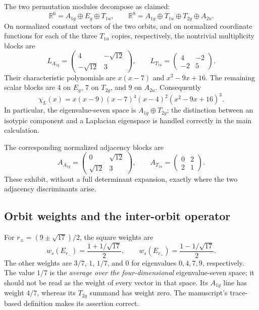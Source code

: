 \documentclass[11pt,a4paper]{article}
\newcommand{\R}{\mathbb R}
\begin{document}
The two permutation modules decompose as claimed:
\[
\R^6=A_{1g}\oplus E_g\oplus T_{1u},\qquad
\R^8=A_{1g}\oplus T_{1u}\oplus T_{2g}\oplus A_{2u}.
\]
On normalized constant vectors of the two orbits, and on normalized coordinate functions for each of the three $T_{1u}$ copies, respectively, the nontrivial multiplicity blocks are
\begin{equation}
L_{A_{1g}}=\begin{pmatrix}4&-\sqrt{12}\\-\sqrt{12}&3\end{pmatrix},
\qquad
L_{T_{1u}}=\begin{pmatrix}4&-2\\-2&5\end{pmatrix}.
\end{equation}
Their characteristic polynomials are $x(x-7)$ and $x^2-9x+16$. The remaining scalar blocks are $4$ on $E_g$, $7$ on $T_{2g}$, and $9$ on $A_{2u}$. Consequently
\[
\chi_L(x)=x(x-9)(x-7)^4(x-4)^2(x^2-9x+16)^3.
\]
In particular, the eigenvalue-seven space is $A_{1g}\oplus T_{2g}$; the distinction between an isotypic component and a Laplacian eigenspace is handled correctly in the main calculation.

The corresponding normalized adjacency blocks are
\[
A_{A_{1g}}=\begin{pmatrix}0&\sqrt{12}\\\sqrt{12}&3\end{pmatrix},
\qquad
A_{T_{1u}}=\begin{pmatrix}0&2\\2&1\end{pmatrix}.
\]
These exhibit, without a full determinant expansion, exactly where the two adjacency discriminants arise.

\subsection*{Orbit weights and the inter-orbit operator}
For $r_\pm=(9\pm\sqrt{17})/2$, the square weights are
\[
 w_s(E_{r_-})=\frac{1+1/\sqrt{17}}2,\qquad
 w_s(E_{r_+})=\frac{1-1/\sqrt{17}}2.
\]
The other weights are $3/7$, $1$, $1/7$, and $0$ for eigenvalues $0,4,7,9$, respectively. The value $1/7$ is the \emph{average over the four-dimensional} eigenvalue-seven space; it should not be read as the weight of every vector in that space. Its $A_{1g}$ line has weight $4/7$, whereas its $T_{2g}$ summand has weight zero. The manuscript's trace-based definition makes its assertion correct.
\end{document}

